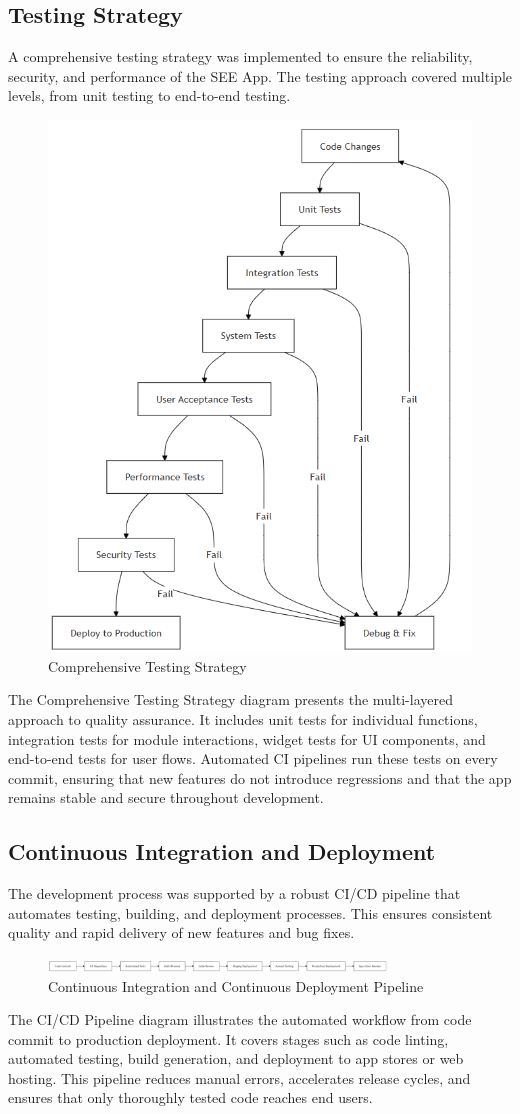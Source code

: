 \documentclass[12pt,a4paper]{article}
\newcommand{\sectiontitle}[1]{\subsection{#1}}
\begin{document}
\sectiontitle{Testing Strategy}

A comprehensive testing strategy was implemented to ensure the reliability, security, and performance of the SEE App. The testing approach covered multiple levels, from unit testing to end-to-end testing.

\begin{figure}[H]
    \centering
    \includegraphics[height=0.35\textwidth,keepaspectratio]{redrawn_diagrams/Figure4_Testing_Strategy.png}
    \caption{Comprehensive Testing Strategy}
    \label{fig:testing-strategy}
\end{figure}
\vspace{0.5em}
The Comprehensive Testing Strategy diagram presents the multi-layered approach to quality assurance. It includes unit tests for individual functions, integration tests for module interactions, widget tests for UI components, and end-to-end tests for user flows. Automated CI pipelines run these tests on every commit, ensuring that new features do not introduce regressions and that the app remains stable and secure throughout development.

\sectiontitle{Continuous Integration and Deployment}

The development process was supported by a robust CI/CD pipeline that automates testing, building, and deployment processes. This ensures consistent quality and rapid delivery of new features and bug fixes.

\begin{figure}[H]
    \centering
    \includegraphics[width=0.8\textwidth,height=0.03\textwidth,keepaspectratio]{redrawn_diagrams/Figure5_CI_CD_Pipeline.png}
    \caption{Continuous Integration and Continuous Deployment Pipeline}
    \label{fig:ci-cd}
\end{figure}
\vspace{0.5em}
The CI/CD Pipeline diagram illustrates the automated workflow from code commit to production deployment. It covers stages such as code linting, automated testing, build generation, and deployment to app stores or web hosting. This pipeline reduces manual errors, accelerates release cycles, and ensures that only thoroughly tested code reaches end users.
\end{document}
